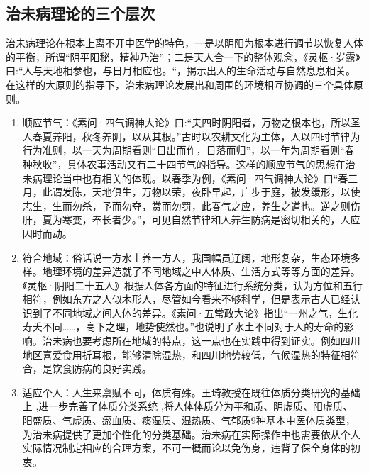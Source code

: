 \subsection{治未病理论的三个层次}
治未病理论在根本上离不开中医学的特色，一是以阴阳为根本进行调节以恢复人体的平衡，所谓“阴平阳秘，精神乃治”；二是天人合一下的整体观念，《灵枢·岁露》曰:“人与天地相参也，与日月相应也。“，揭示出人的生命活动与自然息息相关。在这样的大原则的指导下，治未病理论发展出和周围的环境相互协调的三个具体原则。
\begin{enumerate}
\item 顺应节气：《素问·四气调神大论》曰:“夫四时阴阳者，万物之根本也，所以圣人春夏养阳，秋冬养阴，以从其根。”\cite{南京中医学院医经教研组1981黄帝内经素问译释}古时以农耕文化为主体，人以四时节律为行为准则，以一天为周期看则“日出而作，日落而归”，以一年为周期看则“春种秋收”，具体农事活动又有二十四节气的指导。这样的顺应节气的思想在治未病理论当中也有相关的体现。以春季为例，《素问·四气调神大论》曰“春三月，此谓发陈，天地俱生，万物以荣，夜卧早起，广步于庭，被发缓形，以使志生，生而勿杀，予而勿夺，赏而勿罚，此春气之应，养生之道也。逆之则伤肝，夏为寒变，奉长者少。”\cite{南京中医学院医经教研组1981黄帝内经素问译释}，可见自然节律和人养生防病是密切相关的，人应因时而动。

\item 符合地域：俗话说一方水土养一方人，我国幅员辽阔，地形复杂，生态环境多样。地理环境的差异造就了不同地域之中人体质、生活方式等等方面的差异。《灵枢·阴阳二十五人》根据人体各方面的特征进行系统分类，认为方位和五行相符，例如东方之人似木形人，尽管如今看来不够科学，但是表示古人已经认识到了不同地域之间人体的差异。《素问·五常政大论》指出“一州之气，生化寿夭不同……，高下之理，地势使然也。”\cite{南京中医学院医经教研组1981黄帝内经素问译释}也说明了水土不同对于人的寿命的影响。治未病也要考虑所在地域的特点，这一点也在实践中得到证实。例如四川地区喜爱食用折耳根，能够清除湿热，和四川地势较低，气候湿热的特征相符合，是饮食防病的良好实践。

\item 适应个人：人生来禀赋不同，体质有殊。王琦教授在既往体质分类研究的基础上 ,进一步完善了体质分类系统 ,将人体体质分为平和质、阴虚质、阳虚质、
阳盛质、气虚质、瘀血质、痰湿质、湿热质、气郁质9种基本中医体质类型\cite{王琦20059}，为治未病提供了更加个性化的分类基础。治未病在实际操作中也需要依从个人实际情况制定相应的合理方案，不可一概而论以免伤身，违背了保全身体的初衷。
\end{enumerate}
